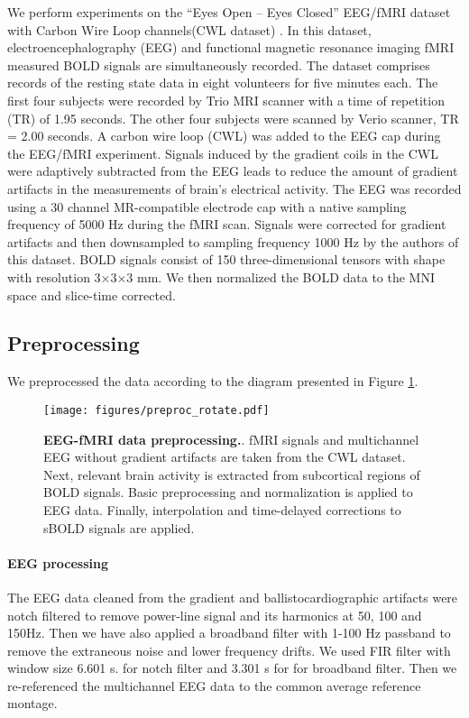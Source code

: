 \documentclass{article}
\begin{document}
We perform experiments on the “Eyes Open – Eyes Closed” EEG/fMRI dataset with Carbon Wire Loop channels(CWL dataset) \cite{cwl_data}. In this dataset, electroencephalography (EEG) and functional magnetic resonance imaging fMRI measured BOLD signals are simultaneously recorded. The dataset comprises records of the resting state data in eight volunteers for five minutes each. The first four subjects were recorded by Trio MRI scanner with a time of repetition (TR) of 1.95 seconds. The other four subjects were scanned by Verio scanner, TR = 2.00 seconds. A carbon wire loop (CWL) was added to the EEG cap during the EEG/fMRI experiment. Signals induced by the gradient coils in the CWL were adaptively subtracted from the EEG leads to reduce the amount of gradient artifacts in the measurements of brain's electrical activity. The EEG was recorded using a 30 channel MR-compatible electrode cap with a native sampling frequency of 5000 Hz during the fMRI scan. Signals were corrected for gradient artifacts and then downsampled to sampling frequency 1000 Hz by the authors of this dataset. BOLD signals consist of 150 three-dimensional tensors with shape  with resolution 3×3×3 mm. We then normalized the BOLD data to the MNI space and slice-time corrected. 









\subsection{Preprocessing}
We preprocessed the data according  to the diagram presented in Figure \ref{fig:preproc}.
\begin{figure}[ht]
    \centering
    \texttt{[image: figures/preproc\_rotate.pdf]}
    \caption{\label{fig:preproc} \textbf{EEG-fMRI data preprocessing.}. fMRI signals and multichannel EEG without gradient artifacts are taken from the CWL dataset. Next, relevant brain activity is extracted from subcortical regions of BOLD signals. Basic preprocessing and normalization is applied to EEG data. Finally, interpolation and time-delayed corrections to sBOLD signals are applied.}
\end{figure}

\paragraph{EEG processing}
The EEG data cleaned from the gradient and ballistocardiographic artifacts were notch filtered to remove power-line signal and its harmonics at 50, 100 and 150Hz. Then we have also applied a broadband filter with 1-100 Hz passband to remove the extraneous noise and lower frequency drifts. We used FIR filter with window size 6.601 s. for notch filter and 3.301 s for  for broadband filter. Then we re-referenced the multichannel EEG data to the common average reference montage. 
\end{document}
